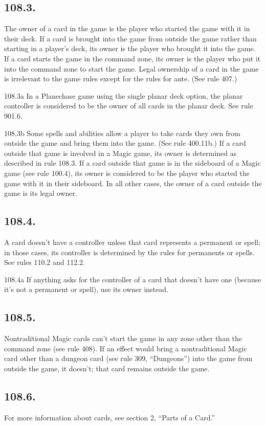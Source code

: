 \subsection*{108.3.}
The owner of a card in the game is the player who started the game with it in their deck. If a card is brought into the game from outside the game rather than starting in a player’s deck, its owner is the player who brought it into the game. If a card starts the game in the command zone, its owner is the player who put it into the command zone to start the game. Legal ownership of a card in the game is irrelevant to the game rules except for the rules for ante. (See rule 407.)

108.3a In a Planechase game using the single planar deck option, the planar controller is considered to be the owner of all cards in the planar deck. See rule 901.6.

108.3b Some spells and abilities allow a player to take cards they own from outside the game and bring them into the game. (See rule 400.11b.) If a card outside that game is involved in a Magic game, its owner is determined as described in rule 108.3. If a card outside that game is in the sideboard of a Magic game (see rule 100.4), its owner is considered to be the player who started the game with it in their sideboard. In all other cases, the owner of a card outside the game is its legal owner.

\subsection*{108.4.}
A card doesn’t have a controller unless that card represents a permanent or spell; in those cases, its controller is determined by the rules for permanents or spells. See rules 110.2 and 112.2.

108.4a If anything asks for the controller of a card that doesn’t have one (because it’s not a permanent or spell), use its owner instead.

\subsection*{108.5.}
Nontraditional Magic cards can’t start the game in any zone other than the command zone (see rule 408). If an effect would bring a nontraditional Magic card other than a dungeon card (see rule 309, “Dungeons”) into the game from outside the game, it doesn’t; that card remains outside the game.

\subsection*{108.6.}
For more information about cards, see section 2, “Parts of a Card.”

